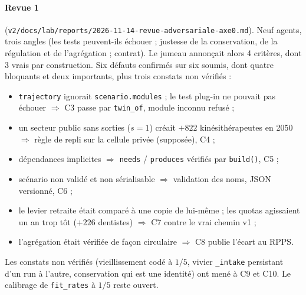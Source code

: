 \paragraph{Revue 1} (\texttt{v2/docs/lab/reports/2026-11-14-revue-adversariale-axe0.md}). Neuf agents, trois angles
(les tests peuvent-ils échouer ; justesse de la conservation, de la régulation et de l'agrégation ; contrat). Le
jumeau annonçait alors 4 critères, dont 3 vrais par construction. Six défauts confirmés sur six soumis, dont
quatre bloquants et deux importants, plus trois constats non vérifiés :
\begin{itemize}
  \item \texttt{trajectory} ignorait \texttt{scenario.modules} ; le test plug-in ne pouvait pas échouer
        $\Rightarrow$ C3 passe par \texttt{twin\_of}, module inconnu refusé ;
  \item un secteur public sans sorties ($s = 1$) créait $+822$\mesure{} kinésithérapeutes en 2050 $\Rightarrow$
        règle de repli sur la cellule privée (supposée), C4 ;
  \item dépendances implicites $\Rightarrow$ \texttt{needs} / \texttt{produces} vérifiés par \texttt{build()}, C5 ;
  \item scénario non validé et non sérialisable $\Rightarrow$ validation des noms, JSON versionné, C6 ;
  \item le levier retraite était comparé à une copie de lui-même ; les quotas agissaient un an trop tôt
        ($+226$\mesure{} dentistes) $\Rightarrow$ C7 contre le vrai chemin v1 ;
  \item l'agrégation était vérifiée de façon circulaire $\Rightarrow$ C8 publie l'écart au RPPS.
\end{itemize}
Les constats non vérifiés (vieillissement codé à $1/5$, vivier \texttt{\_intake} persistant d'un run à l'autre,
conservation qui est une identité) ont mené à C9 et C10. Le calibrage de \texttt{fit\_rates} à $1/5$ reste
ouvert.

